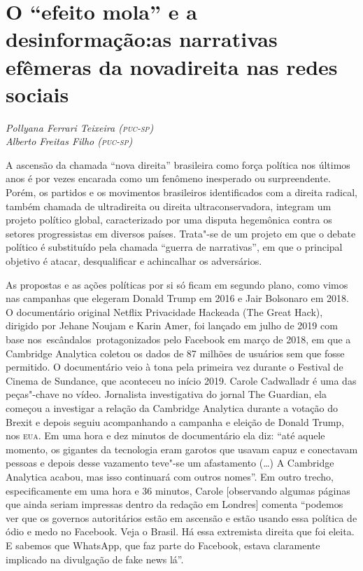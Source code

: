 \chapter*{O ``efeito mola'' e a desinformação:\break as narrativas efêmeras da
nova\break direita nas redes sociais}

\begin{flushright}
\emph{Pollyana Ferrari Teixeira (\textsc{puc-sp})\\Alberto Freitas Filho (\textsc{puc-sp})}
\end{flushright}

A ascensão da chamada ``nova direita'' brasileira como força política
nos últimos anos é por vezes encarada como um fenômeno inesperado ou
surpreendente. Porém, os partidos e os movimentos brasileiros
identificados com a direita radical, também chamada de ultradireita ou
direita ultraconservadora, integram um projeto político global,
caracterizado por uma disputa hegemônica contra os setores progressistas
em diversos países. Trata"-se de um projeto em que o debate político é
substituído pela chamada ``guerra de narrativas'', em que o principal
objetivo é atacar, desqualificar e achincalhar os adversários.

As propostas e as ações políticas por si só ficam em segundo plano, como
vimos nas campanhas que elegeram Donald Trump em 2016 e Jair Bolsonaro
em 2018. O documentário original Netflix Privacidade Hackeada (The Great
Hack), dirigido por Jehane Noujam e Karin Amer, foi lançado em julho de
2019 com base nos~escândalos~protagonizados pelo Facebook em março de
2018, em que a Cambridge Analytica coletou os dados de 87 milhões de
usuários sem que fosse permitido. O documentário veio à tona pela
primeira vez durante o Festival de Cinema de Sundance, que aconteceu no
início 2019. Carole Cadwalladr é uma das peças"-chave no vídeo.
Jornalista investigativa do jornal The Guardian, ela começou a
investigar a relação da Cambridge Analytica durante a votação do Brexit
e depois seguiu acompanhando a campanha e eleição de Donald Trump, nos
\textsc{eua}. Em uma hora e dez minutos de documentário ela diz: ``até aquele
momento, os gigantes da tecnologia eram garotos que usavam capuz e
conectavam pessoas e depois desse vazamento teve"-se um afastamento (\ldots{})
A Cambridge Analytica acabou, mas isso continuará com outros nomes''. Em
outro trecho, especificamente em uma hora e 36 minutos, Carole
{[}observando algumas páginas que ainda seriam impressas dentro da
redação em Londres{]} comenta ``podemos ver que os governos autoritários
estão em ascensão e estão usando essa política de ódio e medo no
Facebook. Veja o Brasil. Há essa extremista direita que foi eleita. E
sabemos que WhatsApp, que faz parte do Facebook, estava claramente
implicado na divulgação de fake news lá''.

